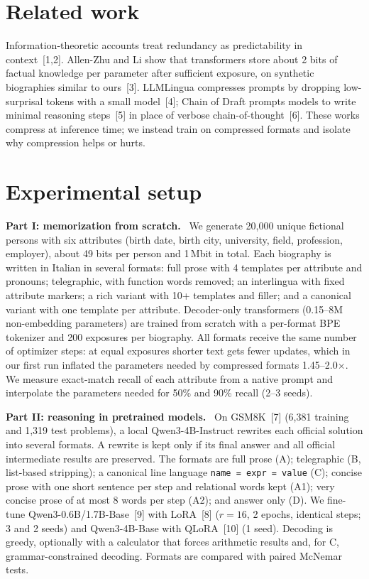 \documentclass[10pt,a4paper,twocolumn]{article}
\renewcommand{\paragraph}[1]{\par\textbf{#1}\ }
\begin{document}
\section{Related work}
Information-theoretic accounts treat redundancy as predictability in context~[1,2]. Allen-Zhu and Li show that transformers store about 2 bits of factual knowledge per parameter after sufficient exposure, on synthetic biographies similar to ours~[3]. LLMLingua compresses prompts by dropping low-surprisal tokens with a small model~[4]; Chain of Draft prompts models to write minimal reasoning steps~[5] in place of verbose chain-of-thought~[6]. These works compress at inference time; we instead train on compressed formats and isolate why compression helps or hurts.

\section{Experimental setup}
\paragraph{Part I: memorization from scratch.} We generate 20,000 unique fictional persons with six attributes (birth date, birth city, university, field, profession, employer), about 49 bits per person and 1\,Mbit in total. Each biography is written in Italian in several formats: full prose with 4 templates per attribute and pronouns; telegraphic, with function words removed; an interlingua with fixed attribute markers; a rich variant with 10+ templates and filler; and a canonical variant with one template per attribute. Decoder-only transformers (0.15--8M non-embedding parameters) are trained from scratch with a per-format BPE tokenizer and 200 exposures per biography. All formats receive the same number of optimizer steps: at equal exposures shorter text gets fewer updates, which in our first run inflated the parameters needed by compressed formats 1.45--2.0$\times$. We measure exact-match recall of each attribute from a native prompt and interpolate the parameters needed for 50\% and 90\% recall (2--3 seeds).

\paragraph{Part II: reasoning in pretrained models.} On GSM8K~[7] (6,381 training and 1,319 test problems), a local Qwen3-4B-Instruct rewrites each official solution into several formats. A rewrite is kept only if its final answer and all official intermediate results are preserved. The formats are full prose (A); telegraphic (B, list-based stripping); a canonical line language \texttt{name = expr = value} (C); concise prose with one short sentence per step and relational words kept (A1); very concise prose of at most 8 words per step (A2); and answer only (D). We fine-tune Qwen3-0.6B/1.7B-Base~[9] with LoRA~[8] ($r{=}16$, 2 epochs, identical steps; 3 and 2 seeds) and Qwen3-4B-Base with QLoRA~[10] (1 seed). Decoding is greedy, optionally with a calculator that forces arithmetic results and, for C, grammar-constrained decoding. Formats are compared with paired McNemar tests.
\end{document}
